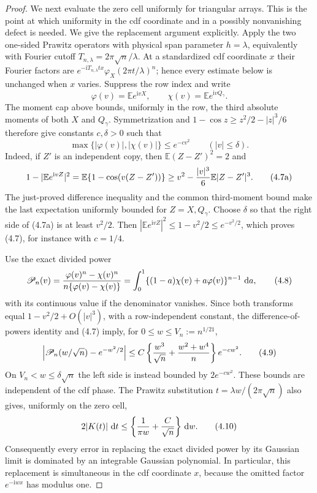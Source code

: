 \documentclass[11pt,a4paper]{article}
\numberwithin{equation}{section}
\theoremstyle{definition}
\theoremstyle{remark}
\newcommand{\E}{\mathbb E}
\newcommand{\ii}{\mathrm i}
\newcommand{\dd}{\,\mathrm d}
\begin{document}
\begin{proof}
We next evaluate the zero cell uniformly for triangular arrays.  This is
the point at which uniformity in the cdf coordinate and in a possibly
nonvanishing defect is needed.  We give the replacement argument
explicitly.  Apply the two one-sided Prawitz operators with physical span
parameter $h=\lambda$, equivalently with Fourier cutoff
$T_{n,\lambda}=2\pi\sqrt n/\lambda$.  At a standardized cdf coordinate $x$
their Fourier factors are
$e^{-\ii T_{n,\lambda}tx}\varphi_X(2\pi t/\lambda)^n$; hence every estimate below
is unchanged when $x$ varies.  Suppress the row index and write
\[
 \varphi(v)=\E e^{\ii vX},\qquad
 \chi(v)=\E e^{\ii vQ_\gamma}.
\]
The moment cap above bounds, uniformly in the row, the third absolute
moments of both $X$ and $Q_\gamma$.  Symmetrization and
$1-\cos z\ge z^2/2-|z|^3/6$ therefore give constants $c,\delta>0$ such
that
\[
 \max\{|\varphi(v)|,|\chi(v)|\}\le e^{-cv^2}
 \qquad (|v|\le\delta).                                \tag{4.7}
\]
Indeed, if $Z'$ is an independent copy, then $\E(Z-Z')^2=2$ and
\[
 1-|\E e^{\ii vZ}|^2
 =\E\{1-\cos(v(Z-Z'))\}
 \ge v^2-{|v|^3\over6}\E|Z-Z'|^3.                       \tag{4.7a}
\]
The just-proved difference inequality and the common third-moment bound
make the last expectation uniformly bounded for $Z=X,Q_\gamma$.
Choose $\delta$ so that the right side of (4.7a) is at least $v^2/2$.
Then $|\E e^{\ii vZ}|^2\le1-v^2/2\le e^{-v^2/2}$, which proves (4.7),
for instance with $c=1/4$.

Use the exact divided power
\[
 \mathscr P_n(v)={\varphi(v)^n-\chi(v)^n\over
                n\{\varphi(v)-\chi(v)\}}
       =\int_0^1\{(1-a)\chi(v)+a\varphi(v)\}^{n-1}\,\dd a,          \tag{4.8}
\]
with its continuous value if the denominator vanishes.  Since both
transforms equal $1-v^2/2+O(|v|^3)$, with a row-independent constant,
the difference-of-powers identity and (4.7) imply, for
$0\le w\le V_n:=n^{1/21}$,
\[
 \left|\mathscr P_n(w/\sqrt n)-e^{-w^2/2}\right|
 \le C\left\{{w^3\over\sqrt n}+{w^2+w^4\over n}\right\}e^{-cw^2}.
                                                               \tag{4.9}
\]
On $V_n<w\le\delta\sqrt n$ the left side is instead bounded by
$2e^{-cw^2}$.  These bounds are independent of the cdf phase.  The
Prawitz substitution $t=\lambda w/(2\pi\sqrt n)$ also gives, uniformly
on the zero cell,
\[
 2|K(t)|\,\dd t\le
       \left\{{1\over\pi w}+{C\over\sqrt n}\right\}\dd w.          \tag{4.10}
\]
Consequently every error in replacing the exact divided power by its
Gaussian limit is dominated by an integrable Gaussian polynomial.  In
particular, this replacement is simultaneous in the cdf coordinate
$x$, because the omitted factor $e^{-\ii wx}$ has modulus one.


\end{proof}
\end{document}
